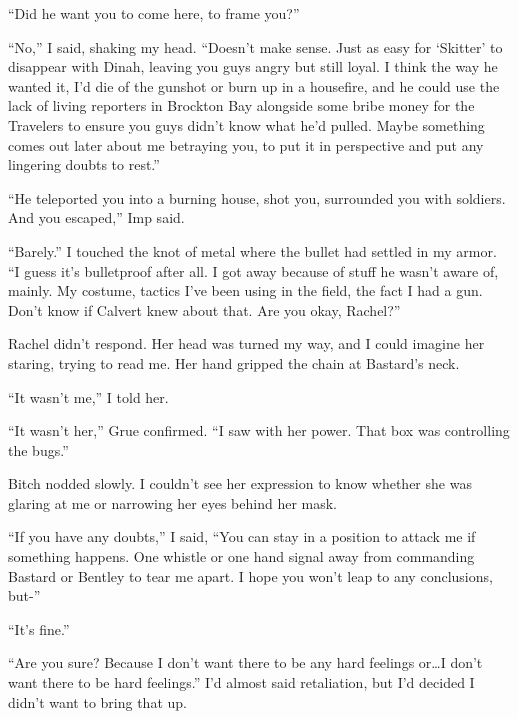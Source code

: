 ``Did he want you to come here, to frame you?''



``No,'' I said, shaking my head.  ``Doesn't make sense.  Just as easy for `Skitter' to disappear with Dinah, leaving you guys angry but still loyal.  I think the way he wanted it, I'd die of the gunshot or burn up in a housefire, and he could use the lack of living reporters in Brockton Bay alongside some bribe money for the Travelers to ensure you guys didn't know what he'd pulled.  Maybe something comes out later about me betraying you, to put it in perspective and put any lingering doubts to rest.''



``He teleported you into a burning house, shot you, surrounded you with soldiers.  And you escaped,'' Imp said.



``Barely.''  I touched the knot of metal where the bullet had settled in my armor.  ``I guess it's bulletproof after all.  I got away because of stuff he wasn't aware of, mainly.  My costume, tactics I've been using in the field, the fact I had a gun.  Don't know if Calvert knew about that.  Are you okay, Rachel?''



Rachel didn't respond.  Her head was turned my way, and I could imagine her staring, trying to read me.  Her hand gripped the chain at Bastard's neck.



``It wasn't me,'' I told her.



``It wasn't her,'' Grue confirmed.  ``I saw with her power.  That box was controlling the bugs.''



Bitch nodded slowly.  I couldn't see her expression to know whether she was glaring at me or narrowing her eyes behind her mask.



``If you have any doubts,'' I said, ``You can stay in a position to attack me if something happens.  One whistle or one hand signal away from commanding Bastard or Bentley to tear me apart.  I hope you won't leap to any conclusions, but-''



``It's fine.''



``Are you sure?  Because I don't want there to be any hard feelings or\ldots I don't want there to be hard feelings.''  I'd almost said retaliation, but I'd decided I didn't want to bring that up.



